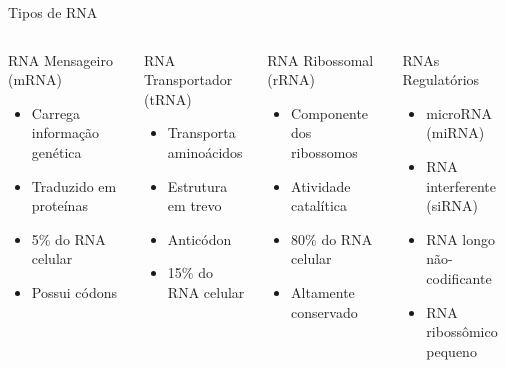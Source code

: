 \begin{frame}[allowframebreaks]{Tipos de RNA}
\begin{columns}
\begin{block}{RNA Mensageiro (mRNA)}
\begin{itemize}
    \item Carrega informação genética
    \item Traduzido em proteínas
    \item 5\% do RNA celular
    \item Possui códons
\end{itemize}
\end{block}

\begin{block}{RNA Transportador (tRNA)}
\begin{itemize}
    \item Transporta aminoácidos
    \item Estrutura em trevo
    \item Anticódon
    \item 15\% do RNA celular
\end{itemize}
\end{block}

\begin{block}{RNA Ribossomal (rRNA)}
\begin{itemize}
    \item Componente dos ribossomos
    \item Atividade catalítica
    \item 80\% do RNA celular
    \item Altamente conservado
\end{itemize}
\end{block}

\begin{block}{RNAs Regulatórios}
\begin{itemize}
    \item microRNA (miRNA)
    \item RNA interferente (siRNA)
    \item RNA longo não-codificante
    \item RNA ribossômico pequeno
\end{itemize}
\end{block}
\end{columns}
\end{frame}

